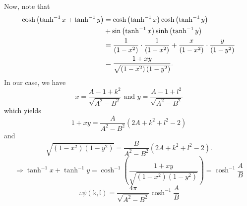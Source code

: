 Now, note that
\begin{align*}
    \cosh \left( \tanh^{-1} x + \tanh^{-1} y \right)
    &= \cosh \left( \tanh^{-1} x \right) \cosh \left( \tanh^{-1} y \right) \\
    &+ \sin \left( \tanh^{-1} x \right) \sinh \left( \tanh^{-1} y \right) \\
    &= \frac{1}{\left( 1 - x^2 \right)} \cdot \frac{1}{\left( 1 - x^2 \right)}
     + \frac{x}{\left( 1 - x^2 \right)} \cdot \frac{y}{\left( 1 - y^2 \right)} \\
    &= \frac{1 + xy}{\sqrt{\left( 1 - x^2 \right) \left( 1 - y^2 \right)}}.
\end{align*}
In our case, we have
\[
    x = \frac{A - 1 + k^2}{\sqrt{A^2 - B^2}} \text{ and } y = \frac{A - 1 + l^2}{\sqrt{A^2 - B^2}}
\]
which yields
\[
    1 + xy = \frac{A}{A^2 - B^2} \left( 2A + k^2 + l^2 - 2 \right)
\]
and
\[
    \sqrt{\left( 1 - x^2 \right) \left( 1 - y^2 \right)}
    = \frac{B}{A^2 - B^2} \left( 2A + k^2 + l^2 - 2 \right).
\]
\[
    \Rightarrow \tanh^{-1} x + \tanh^{-1} y
    = \cosh^{-1} \left( \frac{1 + xy}{\sqrt{\left( 1 - x^2 \right) \left( 1 - y^2 \right)}} \right)
    = \cosh^{-1} \frac{A}{B}
\]
\[
    \therefore \psi \left(\mathbb{k}, \mathbb{l} \right)
    = \frac{4\pi}{\sqrt{A^2 - B^2}} \cosh^{-1} \frac{A}{B}
\]